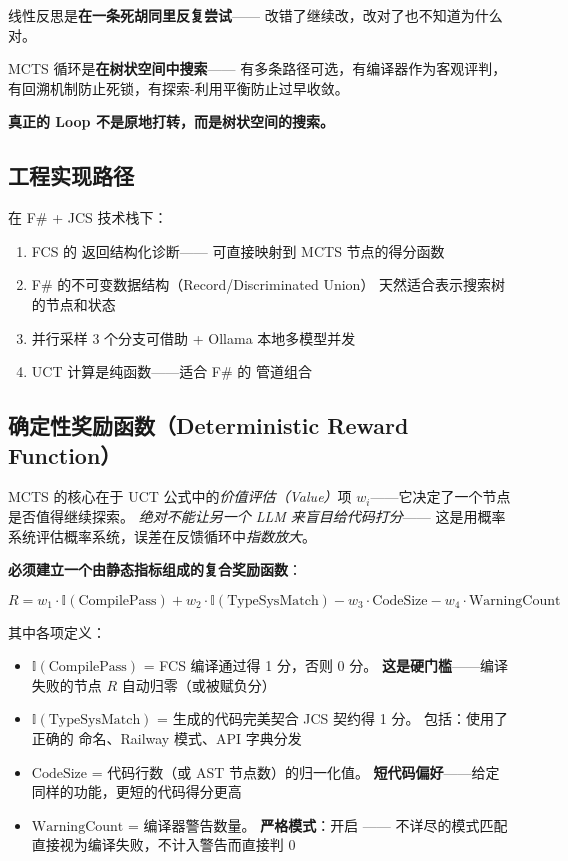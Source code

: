 \documentclass[10pt, openany]{book}
\begin{document}
\begin{principle}[真正的循环不是原地打转]
    线性反思是\textbf{在一条死胡同里反复尝试}——
    改错了继续改，改对了也不知道为什么对。
    
    MCTS 循环是\textbf{在树状空间中搜索}——
    有多条路径可选，有编译器作为客观评判，
    有回溯机制防止死锁，有探索-利用平衡防止过早收敛。
    
    \textbf{真正的 Loop 不是原地打转，而是树状空间的搜索。}
\end{principle}

\subsection{工程实现路径}

在 F\# + JCS 技术栈下：
\begin{enumerate}
    \item FCS 的  返回结构化诊断——
        可直接映射到 MCTS 节点的得分函数
    \item F\# 的不可变数据结构（Record/Discriminated Union）
        天然适合表示搜索树的节点和状态
    \item 并行采样 3 个分支可借助  + Ollama 本地多模型并发
    \item UCT 计算是纯函数——适合 F\# 的 \cmd{|>} 管道组合
\end{enumerate}

\subsection{确定性奖励函数（Deterministic Reward Function）}

MCTS 的核心在于 UCT 公式中的\emph{价值评估（Value）}项 \(w_i\)——它决定了一个节点是否值得继续探索。
\emph{绝对不能让另一个 LLM 来盲目给代码打分}——
这是用概率系统评估概率系统，误差在反馈循环中\emph{指数放大}。

\textbf{必须建立一个由静态指标组成的复合奖励函数}：

\[
R = w_1 \cdot \mathbb{I}(\text{CompilePass}) + w_2 \cdot \mathbb{I}(\text{TypeSysMatch}) - w_3 \cdot \text{CodeSize} - w_4 \cdot \text{WarningCount}
\]

\noindent 其中各项定义：
\begin{itemize}
    \item \textbf{\(\mathbb{I}(\text{CompilePass})\)} = FCS 编译通过得 1 分，否则 0 分。
        \textbf{这是硬门槛}——编译失败的节点 \(R\) 自动归零（或被赋负分）
    \item \textbf{\(\mathbb{I}(\text{TypeSysMatch})\)} = 生成的代码完美契合 JCS 契约得 1 分。
        包括：使用了正确的  命名、Railway 模式、API 字典分发
    \item \textbf{\(\text{CodeSize}\)} = 代码行数（或 AST 节点数）的归一化值。
        \textbf{短代码偏好}——给定同样的功能，更短的代码得分更高
    \item \textbf{\(\text{WarningCount}\)} = 编译器警告数量。
        \textbf{严格模式}：开启 ——
        不详尽的模式匹配直接视为编译失败，不计入警告而直接判 0
\end{itemize}
\end{document}
